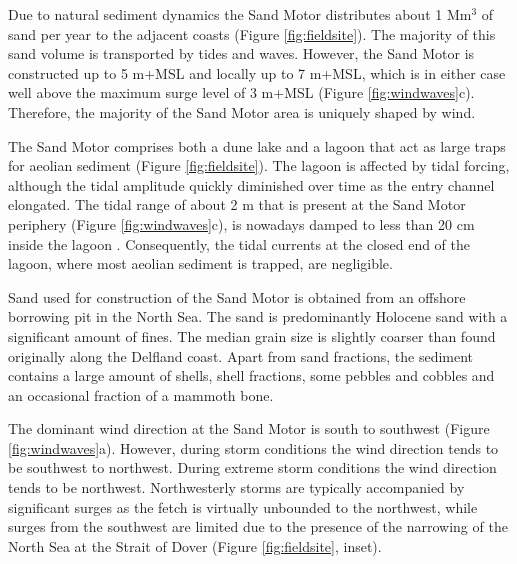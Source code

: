 Due to natural sediment dynamics the Sand Motor distributes about 1
$\mathrm{Mm^3}$ of sand per year to the adjacent coasts (Figure
\ref{fig:fieldsite}). The majority of this sand volume is transported
by tides and waves. However, the Sand Motor is constructed up to 5
m+MSL and locally up to 7 m+MSL, which is in either case well above
the maximum surge level of 3 m+MSL (Figure
\ref{fig:windwaves}c). Therefore, the majority of the Sand Motor area
is uniquely shaped by wind.

The Sand Motor comprises both a dune lake and a lagoon that act as
large traps for aeolian sediment (Figure \ref{fig:fieldsite}). The
lagoon is affected by tidal forcing, although the tidal amplitude
quickly diminished over time as the entry channel elongated. The tidal
range of about 2 m that is present at the Sand Motor periphery (Figure
\ref{fig:windwaves}c), is nowadays damped to less than 20 cm inside
the lagoon \citep{deVries2015}. Consequently, the tidal currents at
the closed end of the lagoon, where most aeolian sediment is trapped,
are negligible.

Sand used for construction of the Sand Motor is obtained from an
offshore borrowing pit in the North Sea. The sand is predominantly
Holocene sand with a significant amount of fines. The median grain
size is slightly coarser than found originally along the Delfland
coast. Apart from sand fractions, the sediment contains a large amount
of shells, shell fractions, some pebbles and cobbles and an occasional
fraction of a mammoth bone.


The dominant wind direction at the Sand Motor is south to southwest
(Figure \ref{fig:windwaves}a). However, during storm conditions the
wind direction tends to be southwest to northwest. During extreme
storm conditions the wind direction tends to be
northwest. Northwesterly storms are typically accompanied by
significant surges as the fetch is virtually unbounded to the
northwest, while surges from the southwest are limited due to the
presence of the narrowing of the North Sea at the Strait of Dover
(Figure \ref{fig:fieldsite}, inset).

